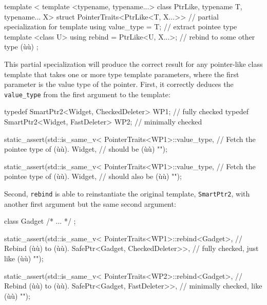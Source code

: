 \begin{emcppslisting}
template <
    template <typename, typename...> class PtrLike,
    typename T, typename... X>
struct PointerTraits<PtrLike<T, X...>>  // partial specialization for template
{
    using value_type = T;               // extract pointee type
    template <class U>
    using rebind = PtrLike<U, X...>;    // rebind to some other type (ù{}ù)
};
\end{emcppslisting}
    

\noindent This partial specialization will produce the correct result for any
pointer-like class template that takes one or more type template
parameters, where the first parameter is the value type of the pointer.
First, it correctly deduces the \lstinline!value_type! from the first
argument to the template:

\begin{emcppslisting}
typedef SmartPtr2<Widget, CheckedDeleter>  WP1;  // fully checked
typedef SmartPtr2<Widget, FastDeleter>     WP2;  // minimally checked

static_assert(std::is_same_v<
    PointerTraits<WP1>::value_type,  // Fetch the pointee type of (ù{}ù).
    Widget,                          // should be (ù{}ù)
"");

static_assert(std::is_same_v<
    PointerTraits<WP1>::value_type,  // Fetch the pointee type of (ù{}ù).
    Widget,                          // should also be (ù{}ù)
"");
\end{emcppslisting}
    

\noindent Second, \lstinline!rebind! is able to reinstantiate the original template,
\lstinline!SmartPtr2!, with another first argument but the same second
argument:

\begin{emcppslisting}
class Gadget { /* ... */ };

static_assert(std::is_same_v<
    PointerTraits<WP1>::rebind<Gadget>,  // Rebind (ù{}ù) to (ù{}ù).
    SafePtr<Gadget, CheckedDeleter>>,    // fully checked, just like (ù{}ù)
"");

static_assert(std::is_same_v<
    PointerTraits<WP2>::rebind<Gadget>,  // Rebind (ù{}ù) to (ù{}ù).
    SafePtr<Gadget, FastDeleter>>,       // minimally checked, like (ù{}ù)
"");
\end{emcppslisting}
    

